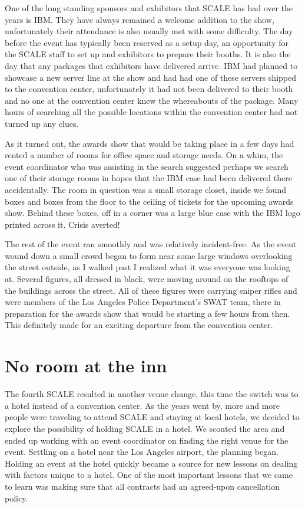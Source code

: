 One of the long standing sponsors and exhibitors that SCALE has had over the
years is IBM. They have always remained a welcome addition to the show,
unfortunately their attendance is also usually met with some difficulty. The
day before the event has typically been reserved as a setup day, an opportunity
for the SCALE staff to set up and exhibitors to prepare their booths. It is also
the day that any packages that exhibitors have delivered arrive. IBM had
planned to showcase a new server line at the show and had had one of these
servers shipped to the convention center, unfortunately it had not been
delivered to their booth and no one at the convention center knew the
whereabouts of the package. Many hours of searching all the possible locations
within the convention center had not turned up any clues.

As it turned out, the awards show that would be taking place in a few days had
rented a number of rooms for office space and storage needs. On a whim, the
event coordinator who was assisting in the search suggested perhaps we search
one of their storage rooms in hopes that the IBM case had been delivered there
accidentally. The room in question was a small storage closet, inside we found
boxes and boxes from the floor to the ceiling of tickets for the upcoming awards
show. Behind these boxes, off in a corner was a large blue case with the IBM
logo printed across it. Crisis averted!

The rest of the event ran smoothly and was relatively incident-free. As the
event wound down a small crowd began to form near some large windows overlooking
the street outside, as I walked past I realized what it was everyone was looking
at. Several figures, all dressed in black, were moving around on the rooftops of
the buildings across the street. All of these figures were carrying sniper
rifles and were members of the Los Angeles Police Department’s SWAT team, there
in preparation for the awards show that would be starting a few hours from then.
This definitely made for an exciting departure from the convention center.

\section*{No room at the inn}

The fourth SCALE resulted in another venue change, this time the switch was to a
hotel instead of a convention center. As the years went by, more and more people
were traveling to attend SCALE and staying at local hotels, we decided to
explore the possibility of holding SCALE in a hotel. We scouted the area and
ended up working with an event coordinator on finding the right venue for the
event. Settling on a hotel near the Los Angeles airport, the planning began. 
Holding an event at the hotel quickly became a source for new lessons on dealing
with factors unique to a hotel. One of the most important lessons that we came
to learn was making sure that all contracts had an agreed-upon cancellation
policy.

